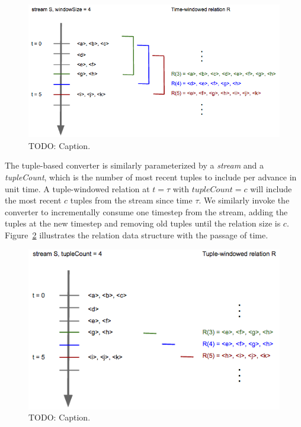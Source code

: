 \documentclass[a4paper, 10pt, conference]{IEEEconf}
\begin{document}
\begin{figure}[tpH]
    \centering
    \centerline{\includegraphics[totalheight=4cm]{time_window.png}}
    \caption{TODO: Caption.}
    \label{fig:time_window}
\end{figure}

The tuple-based converter is similarly parameterized by a \textit{stream} and a \textit{tupleCount}, which is the number of most recent tuples to include per advance in unit time. A tuple-windowed relation at $t = \tau$ with $tupleCount = c$ will include the most recent $c$ tuples from the stream since time $\tau$. We similarly invoke the converter to incrementally consume one timestep from the stream, adding the tuples at the new timestep and removing old tuples until the relation size is $c$. Figure~\ref{fig:tuple_window} illustrates the relation data structure with the passage of time. 

\begin{figure}[tpH]
    \centering
    \centerline{\includegraphics[totalheight=4cm]{tuple_window.png}}
    \caption{TODO: Caption.}
    \label{fig:tuple_window}
\end{figure}
\end{document}
